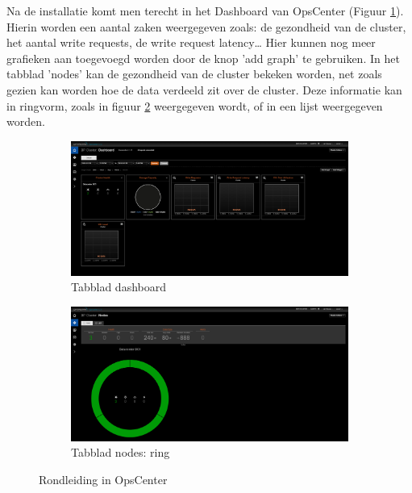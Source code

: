 Na de installatie komt men terecht in het Dashboard van OpsCenter (Figuur \ref{fig:cas_opscenter_tour_dashboard}).
Hierin worden een aantal zaken weergegeven zoals: de gezondheid van de cluster, het aantal write requests, de write request latency\dots
Hier kunnen nog meer grafieken aan toegevoegd worden door de knop 'add graph' te gebruiken.
In het tabblad 'nodes' kan de gezondheid van de cluster bekeken worden, net zoals gezien kan worden hoe de data verdeeld zit over de cluster.
Deze informatie kan in ringvorm, zoals in figuur \ref{fig:cas_opscenter_tour_nodes} weergegeven wordt, of in een lijst weergegeven worden.

\begin{figure}[H]
	\centering
	\begin{subfigure}{.49\textwidth}
		\centering
		\includegraphics[width=.99\linewidth]{img/4_installatie_cassandra/2_Tour_1_Dashboard}
		\caption{Tabblad dashboard}
		\label{fig:cas_opscenter_tour_dashboard}
	\end{subfigure}
	\begin{subfigure}{.49\textwidth}
		\centering
		\includegraphics[width=.99\linewidth]{img/4_installatie_cassandra/2_Tour_2_Nodes}
		\caption{Tabblad nodes: ring}
		\label{fig:cas_opscenter_tour_nodes}
	\end{subfigure}
	\caption{Rondleiding in OpsCenter}
	\label{fig:cas_opscenter_tour}
\end{figure}

